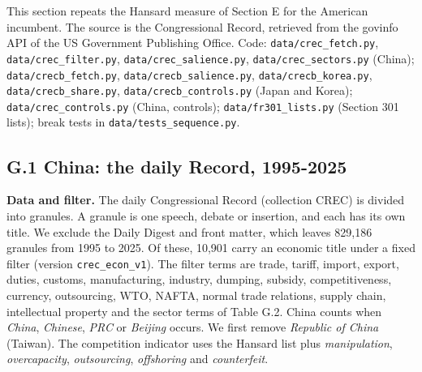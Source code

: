 This section repeats the Hansard measure of Section E for the American
incumbent. The source is the Congressional Record, retrieved from the
govinfo API of the US Government Publishing Office. Code:
\texttt{data/\allowbreak{}crec\_\allowbreak{}fetch.py}, \texttt{data/\allowbreak{}crec\_\allowbreak{}filter.py},
\texttt{data/\allowbreak{}crec\_\allowbreak{}salience.py}, \texttt{data/\allowbreak{}crec\_\allowbreak{}sectors.py} (China);
\texttt{data/\allowbreak{}crecb\_\allowbreak{}fetch.py}, \texttt{data/\allowbreak{}crecb\_\allowbreak{}salience.py},
\texttt{data/\allowbreak{}crecb\_\allowbreak{}korea.py}, \texttt{data/\allowbreak{}crecb\_\allowbreak{}share.py},
\texttt{data/\allowbreak{}crecb\_\allowbreak{}controls.py} (Japan and Korea);
\texttt{data/\allowbreak{}crec\_\allowbreak{}controls.py} (China, controls);
\texttt{data/\allowbreak{}fr301\_\allowbreak{}lists.py} (Section 301 lists); break tests in
\texttt{data/\allowbreak{}tests\_\allowbreak{}sequence.py}.

\hypertarget{g.1-china-the-daily-record-1995-2025}{%
\subsection*{G.1 China: the daily Record,
1995-2025}\label{g.1-china-the-daily-record-1995-2025}}

\textbf{Data and filter.} The daily Congressional Record (collection
CREC) is divided into granules. A granule is one speech, debate or
insertion, and each has its own title. We exclude the Daily Digest and
front matter, which leaves 829,186 granules from 1995 to 2025. Of these,
10,901 carry an economic title under a fixed filter (version
\texttt{crec\_\allowbreak{}econ\_\allowbreak{}v1}). The filter terms are trade, tariff, import,
export, duties, customs, manufacturing, industry, dumping, subsidy,
competitiveness, currency, outsourcing, WTO, NAFTA, normal trade
relations, supply chain, intellectual property and the sector terms of
Table G.2. China counts when \emph{China}, \emph{Chinese}, \emph{PRC} or
\emph{Beijing} occurs. We first remove \emph{Republic of China}
(Taiwan). The competition indicator uses the Hansard list plus
\emph{manipulation}, \emph{overcapacity}, \emph{outsourcing},
\emph{offshoring} and \emph{counterfeit}.

